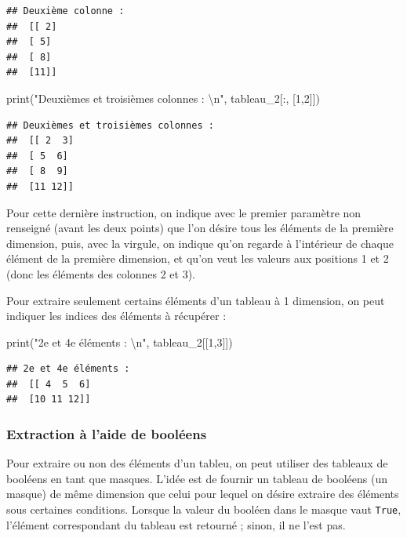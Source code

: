 \documentclass[12pt,]{book}
\newenvironment{Shaded}{\begin{snugshade}}{\end{snugshade}}
\newcommand{\DecValTok}[1]{\textcolor[rgb]{0.00,0.00,0.81}{#1}}
\newcommand{\CharTok}[1]{\textcolor[rgb]{0.31,0.60,0.02}{#1}}
\newcommand{\StringTok}[1]{\textcolor[rgb]{0.31,0.60,0.02}{#1}}
\newcommand{\BuiltInTok}[1]{#1}
\newcommand{\NormalTok}[1]{#1}
\numberwithin{equation}{section}
\numberwithin{countremarque}{section}
\begin{document}
\begin{lstlisting}
## Deuxième colonne : 
##  [[ 2]
##  [ 5]
##  [ 8]
##  [11]]
\end{lstlisting}

\begin{Shaded}
\begin{Highlighting}[]
\BuiltInTok{print}\NormalTok{(}\StringTok{"Deuxièmes et troisièmes colonnes : }\CharTok{\textbackslash{}n}\StringTok{"}\NormalTok{, tableau_2[:, [}\DecValTok{1}\NormalTok{,}\DecValTok{2}\NormalTok{]])}
\end{Highlighting}
\end{Shaded}

\begin{lstlisting}
## Deuxièmes et troisièmes colonnes : 
##  [[ 2  3]
##  [ 5  6]
##  [ 8  9]
##  [11 12]]
\end{lstlisting}

Pour cette dernière instruction, on indique avec le premier paramètre
non renseigné (avant les deux points) que l'on désire tous les éléments
de la première dimension, puis, avec la virgule, on indique qu'on
regarde à l'intérieur de chaque élément de la première dimension, et
qu'on veut les valeurs aux positions 1 et 2 (donc les éléments des
colonnes 2 et 3).

Pour extraire seulement certains éléments d'un tableau à 1 dimension, on
peut indiquer les indices des éléments à récupérer :

\begin{Shaded}
\begin{Highlighting}[]
\BuiltInTok{print}\NormalTok{(}\StringTok{"2e et 4e éléments : }\CharTok{\textbackslash{}n}\StringTok{"}\NormalTok{, tableau_2[[}\DecValTok{1}\NormalTok{,}\DecValTok{3}\NormalTok{]])}
\end{Highlighting}
\end{Shaded}

\begin{lstlisting}
## 2e et 4e éléments : 
##  [[ 4  5  6]
##  [10 11 12]]
\end{lstlisting}

\subsubsection{Extraction à l'aide de
booléens}\label{extraction-a-laide-de-booleens}

Pour extraire ou non des éléments d'un tableu, on peut utiliser des
tableaux de booléens en tant que masques. L'idée est de fournir un
tableau de booléens (un masque) de même dimension que celui pour lequel
on désire extraire des éléments sous certaines conditions. Lorsque la
valeur du booléen dans le masque vaut \texttt{True}, l'élément
correspondant du tableau est retourné ; sinon, il ne l'est pas.
\end{document}
